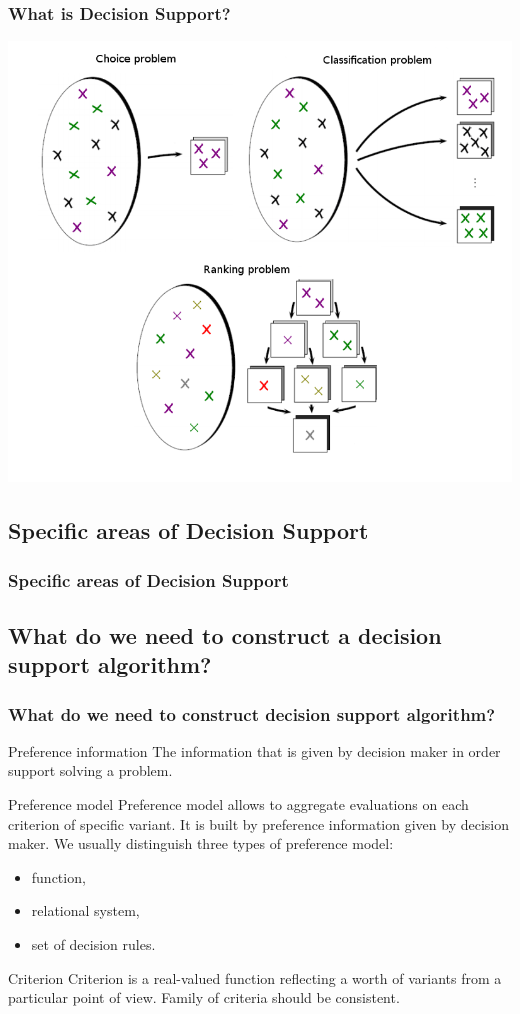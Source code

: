 \documentclass{beamer}
\begin{document}
\begin{frame}
\frametitle{What is Decision Support?}
\begin{center}
\includegraphics[scale=0.34]{problems.png}
\end{center}
\end{frame}


\subsection{Specific areas of Decision Support}
\begin{frame}
\frametitle{Specific areas of Decision Support}
\end{frame}

\subsection{What do we need to construct a decision support algorithm?}
\begin{frame}
\frametitle{What do we need to construct decision support algorithm?}
\begin{block}{Preference information}
The information that is given by decision maker in order support solving a problem.
\end{block}
\begin{block}{Preference model}
Preference model allows to aggregate evaluations on each criterion of specific variant.
It is built by preference information given by decision maker. We usually distinguish three types of preference model:
\begin{itemize}
\item function,
\item relational system,
\item set of decision rules.
\end{itemize}
\end{block}
\begin{block}{Criterion}
Criterion is a real-valued function reflecting a worth of variants from a particular point of view. Family of criteria should be consistent.
\end{block}
\end{frame}
\end{document}
